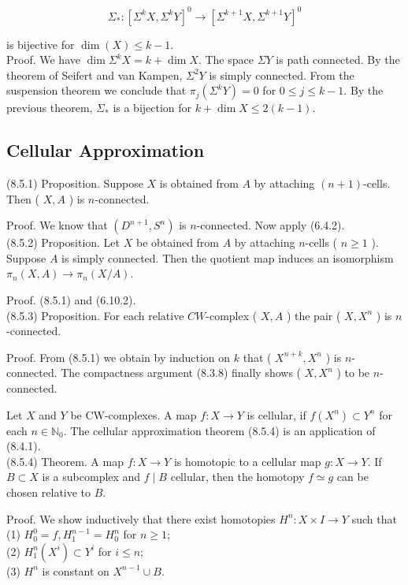 \documentclass[10pt, letterpaper]{article}
\begin{document}
$$
\Sigma_{*}:\left[\Sigma^{k} X, \Sigma^{k} Y\right]^{0} \rightarrow\left[\Sigma^{k+1} X, \Sigma^{k+1} Y\right]^{0}
$$

is bijective for $\operatorname{dim}(X) \leq k-1$.\\
Proof. We have $\operatorname{dim} \Sigma^{k} X=k+\operatorname{dim} X$. The space $\Sigma Y$ is path connected. By the theorem of Seifert and van Kampen, $\Sigma^{2} Y$ is simply connected. From the suspension theorem we conclude that $\pi_{j}\left(\Sigma^{k} Y\right)=0$ for $0 \leq j \leq k-1$. By the previous theorem, $\Sigma_{*}$ is a bijection for $k+\operatorname{dim} X \leq 2(k-1)$.

\subsection*{Cellular Approximation}
(8.5.1) Proposition. Suppose $X$ is obtained from $A$ by attaching $(n+1)$-cells. Then ( $X, A$ ) is $n$-connected.

Proof. We know that $\left(D^{n+1}, S^{n}\right)$ is $n$-connected. Now apply (6.4.2).\\
(8.5.2) Proposition. Let $X$ be obtained from $A$ by attaching $n$-cells ( $n \geq 1$ ). Suppose $A$ is simply connected. Then the quotient map induces an isomorphism $\pi_{n}(X, A) \rightarrow \pi_{n}(X / A)$.

Proof. (8.5.1) and (6.10.2).\\
(8.5.3) Proposition. For each relative $C W$-complex ( $X, A$ ) the pair ( $X, X^{n}$ ) is $n$-connected.

Proof. From (8.5.1) we obtain by induction on $k$ that ( $X^{n+k}, X^{n}$ ) is $n$-connected. The compactness argument (8.3.8) finally shows ( $X, X^{n}$ ) to be $n$-connected.

Let $X$ and $Y$ be CW-complexes. A map $f: X \rightarrow Y$ is cellular, if $f\left(X^{n}\right) \subset Y^{n}$ for each $n \in \mathbb{N}_{0}$. The cellular approximation theorem (8.5.4) is an application of (8.4.1).\\
(8.5.4) Theorem. A map $f: X \rightarrow Y$ is homotopic to a cellular map $g: X \rightarrow Y$. If $B \subset X$ is a subcomplex and $f \mid B$ cellular, then the homotopy $f \simeq g$ can be chosen relative to $B$.

Proof. We show inductively that there exist homotopies $H^{n}: X \times I \rightarrow Y$ such that\\
(1) $H_{0}^{0}=f, H_{1}^{n-1}=H_{0}^{n}$ for $n \geq 1$;\\
(2) $H_{1}^{n}\left(X^{i}\right) \subset Y^{i}$ for $i \leq n$;\\
(3) $H^{n}$ is constant on $X^{n-1} \cup B$.
\end{document}
